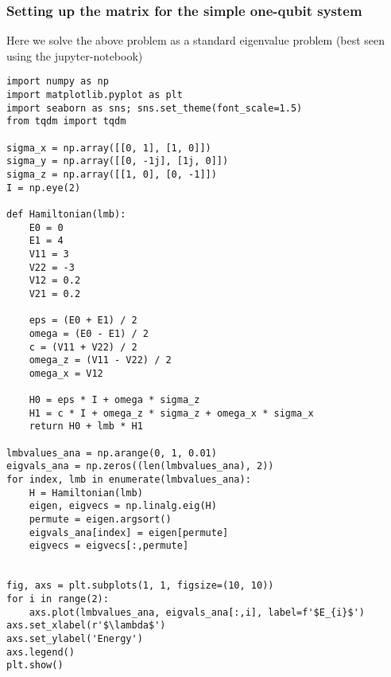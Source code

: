 \documentclass{beamer}
\begin{document}
\begin{frame}
\frametitle{Setting up the matrix for the simple one-qubit system}

Here we solve the above problem as a standard eigenvalue problem (best seen using the jupyter-notebook)
















































\begin{verbatim}
import numpy as np
import matplotlib.pyplot as plt
import seaborn as sns; sns.set_theme(font_scale=1.5)
from tqdm import tqdm

sigma_x = np.array([[0, 1], [1, 0]])
sigma_y = np.array([[0, -1j], [1j, 0]])
sigma_z = np.array([[1, 0], [0, -1]])
I = np.eye(2)

def Hamiltonian(lmb):
    E0 = 0
    E1 = 4
    V11 = 3
    V22 = -3
    V12 = 0.2
    V21 = 0.2

    eps = (E0 + E1) / 2
    omega = (E0 - E1) / 2
    c = (V11 + V22) / 2
    omega_z = (V11 - V22) / 2
    omega_x = V12

    H0 = eps * I + omega * sigma_z
    H1 = c * I + omega_z * sigma_z + omega_x * sigma_x
    return H0 + lmb * H1
    
lmbvalues_ana = np.arange(0, 1, 0.01)
eigvals_ana = np.zeros((len(lmbvalues_ana), 2))
for index, lmb in enumerate(lmbvalues_ana):
    H = Hamiltonian(lmb)
    eigen, eigvecs = np.linalg.eig(H)
    permute = eigen.argsort()
    eigvals_ana[index] = eigen[permute]
    eigvecs = eigvecs[:,permute]


fig, axs = plt.subplots(1, 1, figsize=(10, 10))
for i in range(2):
    axs.plot(lmbvalues_ana, eigvals_ana[:,i], label=f'$E_{i}$')
axs.set_xlabel(r'$\lambda$')
axs.set_ylabel('Energy')
axs.legend()
plt.show()


\end{verbatim}
\end{frame}
\end{document}
